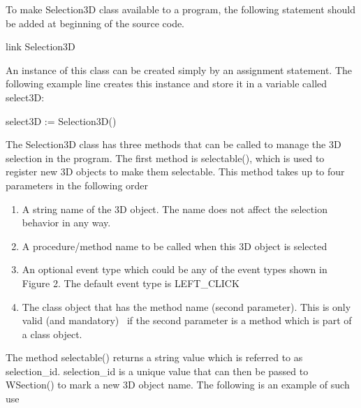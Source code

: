 \documentclass[letterpaper]{article}
\newcommand\liststyleLix{%
\renewcommand\theenumi{\arabic{enumi}}
\renewcommand\theenumii{\arabic{enumii}}
\renewcommand\theenumiii{\arabic{enumiii}}
\renewcommand\theenumiv{\arabic{enumiv}}
\renewcommand\labelenumi{\theenumi.}
\renewcommand\labelenumii{\theenumii.}
\renewcommand\labelenumiii{\theenumiii.}
\renewcommand\labelenumiv{\theenumiv.}
}
\begin{document}
\bigskip

{
To make Selection3D class available to a program, the following statement should be added at beginning of the source
code.}


\bigskip

{\sffamily
link Selection3D}


\bigskip

{
An instance of this class can be created simply by an assignment statement. The following example line creates this
instance and store it in a variable called \textsf{select3D:}}


\bigskip

{\sffamily
select3D := Selection3D()}


\bigskip

{
The \textsf{Selection3D} class has three methods that can be called to manage the 3D selection in the program. The first
method is \textsf{selectable()}, which is used to register new 3D objects to make them selectable. This method takes up
to four parameters in the following order}


\bigskip

\liststyleLix
\begin{enumerate}
\item {
A string name of the 3D object. The name does not affect the selection behavior in any way. }
\item {
A procedure/method name to be called when this 3D object is selected}
\item {
An optional event type which could be any of the event types shown in Figure 2. The default event type is
\textsf{LEFT\_CLICK}}
\item {
The class object that has the method name (second parameter). This is only valid (and mandatory) \ if the second
parameter is a method which is part of a class object.}
\end{enumerate}

\bigskip

{
The method \textsf{selectable()} returns a string value which is referred to as selection\_id. selection\_id is a unique
value that can then be passed to \textsf{WSection()} to mark a new 3D object name. The following is an example of such
use}


\bigskip
\end{document}
